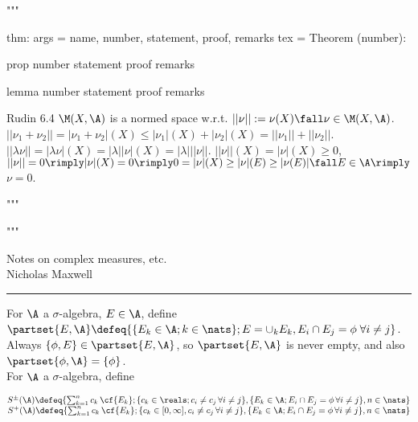 """


thm:
args = { name, number, statement, proof, remarks }
tex  = 
Theorem (number):

prop
    number
    statement
    proof
    remarks

lemma
    number
    statement
    proof
    remarks




Rudin 6.4
$\M(X, \A)$ is a normed space w.r.t. $||\nu|| := \nu(X) \fall \nu \in \M(X, \A)$.
$|| \nu_1 + \nu_2 || = |\nu_1 + \nu_2|(X) \le |\nu_1|(X) + |\nu_2|(X) = ||\nu_1|| + ||\nu_2|| $. $||\lambda \nu|| = |\lambda \nu|(X) = |\lambda| |\nu|(X) = |\lambda| ||\nu||$. $||\nu||(X) = |\nu|(X) \ge 0$, $||\nu|| = 0 \rimply |\nu|(X) = 0 \rimply 0 = |\nu|(X) \ge |\nu|(E) \ge |\nu(E)| \fall E \in \A \rimply$ $\nu = 0$.

"""




"""



\begin{flushleft}
Notes on complex measures, etc. \\
Nicholas Maxwell\\
\end{flushleft}

\begin{flushleft}
\addvspace{5pt} \hrule
\end{flushleft}	

For $\A$ a $\sigma$-algebra, $E \in \A$, define $\partset{E, \A} \defeq \{ \{ E_k \in \A; k \in \nats \}; E = \cup_k E_k, E_i \cap E_j = \phi \;  \forall i \not = j \}$. Always $ \{ \phi, E \} \in \partset{E, \A}$, so $\partset{E, \A}$ is never empty, and also $\partset{\phi, \A} = \{ \phi \}$.    \\

For $\A$ a $\sigma$-algebra, define 


\noindent
$S^\pm(\A) \defeq \{ \sum_{k=1}^n c_k \, \cf{E_k}; \{c_k \in\reals; c_i \not = c_j \, \forall i \not = j\}, \{E_k \in \A; E_i \cap E_j = \phi \, \forall i \not = j \}, n \in \nats \}$ \\
\noindent
$S^{+}(\A) \defeq \{ \sum_{k=1}^n c_k \, \cf{E_k}; \{c_k \in [0, \infty], c_i \not = c_j \, \forall i \not = j\}, \{E_k \in \A; E_i \cap E_j = \phi \, \forall i \not = j \}, n \in \nats \}$ \\



